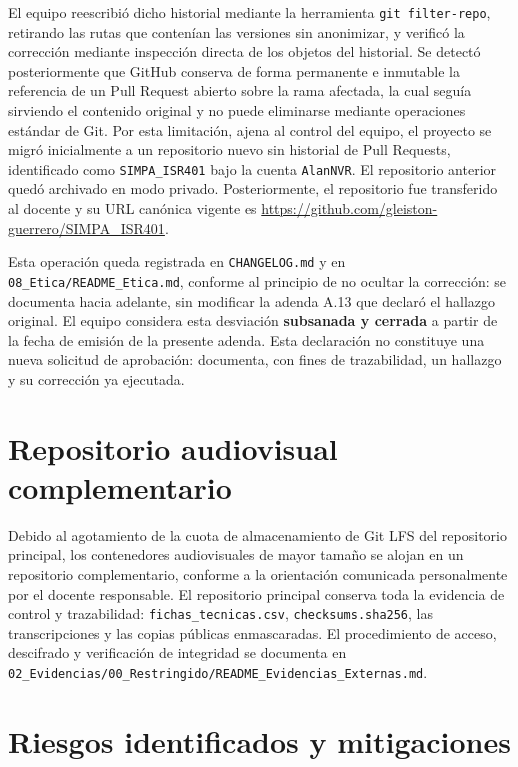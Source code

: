 \documentclass[11pt,a4paper]{article}
\begin{document}
El equipo reescribió dicho historial mediante la herramienta \texttt{git filter-repo}, retirando las rutas
que contenían las versiones sin anonimizar, y verificó la corrección mediante inspección directa de los
objetos del historial. Se detectó posteriormente que GitHub conserva de forma permanente e inmutable la
referencia de un Pull Request abierto sobre la rama afectada, la cual seguía sirviendo el contenido
original y no puede eliminarse mediante operaciones estándar de Git. Por esta limitación, ajena al control
del equipo, el proyecto se migró inicialmente a un repositorio nuevo sin historial de Pull Requests, identificado como
\texttt{SIMPA\_ISR401} bajo la cuenta \texttt{AlanNVR}. El repositorio anterior quedó archivado en modo privado. Posteriormente, el repositorio fue transferido al docente y su URL canónica vigente es \url{https://github.com/gleiston-guerrero/SIMPA_ISR401}.

Esta operación queda registrada en \texttt{CHANGELOG.md} y en \texttt{08\_Etica/README\_Etica.md}, conforme
al principio de no ocultar la corrección: se documenta hacia adelante, sin modificar la adenda A.13 que
declaró el hallazgo original. El equipo considera esta desviación \textbf{subsanada y cerrada} a partir de
la fecha de emisión de la presente adenda. Esta declaración no constituye una nueva solicitud de
aprobación: documenta, con fines de trazabilidad, un hallazgo y su corrección ya ejecutada.

\section{Repositorio audiovisual complementario}

Debido al agotamiento de la cuota de almacenamiento de Git LFS del repositorio principal, los contenedores
audiovisuales de mayor tamaño se alojan en un repositorio complementario, conforme a la orientación
comunicada personalmente por el docente responsable. El repositorio principal conserva toda la evidencia
de control y trazabilidad: \texttt{fichas\_tecnicas.csv}, \texttt{checksums.sha256}, las transcripciones y
las copias públicas enmascaradas. El procedimiento de acceso, descifrado y verificación de integridad se
documenta en \texttt{02\_Evidencias/00\_Restringido/README\_Evidencias\_Externas.md}.

\section{Riesgos identificados y mitigaciones}
\end{document}
